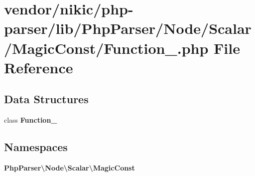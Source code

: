 \section{vendor/nikic/php-\/parser/lib/\+Php\+Parser/\+Node/\+Scalar/\+Magic\+Const/\+Function\+\_\+.php File Reference}
\label{_node_2_scalar_2_magic_const_2_function___8php}
\subsection*{Data Structures}
\begin{DoxyCompactItemize}
\item 
class {\bf Function\+\_\+}
\end{DoxyCompactItemize}
\subsection*{Namespaces}
\begin{DoxyCompactItemize}
\item 
 {\bf Php\+Parser\textbackslash{}\+Node\textbackslash{}\+Scalar\textbackslash{}\+Magic\+Const}
\end{DoxyCompactItemize}
